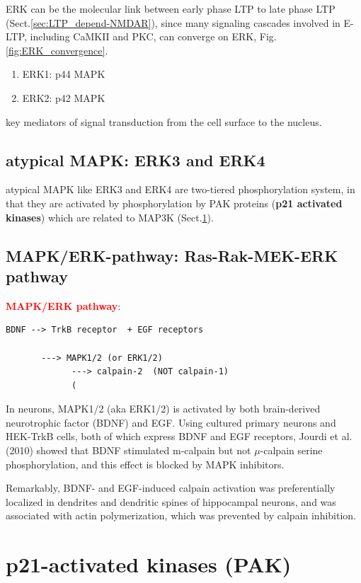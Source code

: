     
ERK can be the molecular link between early phase LTP to late phase LTP
(Sect.\ref{sec:LTP_depend-NMDAR}), since many signaling cascades involved in
E-LTP, including CaMKII and PKC, can converge on ERK,
Fig.\ref{fig:ERK_convergence}.
  
\begin{enumerate}
    \item ERK1: p44 MAPK
    \item ERK2: p42 MAPK
\end{enumerate}
key mediators of signal transduction from the cell surface to the nucleus. 

\subsection{atypical MAPK: ERK3 and ERK4}
\label{sec:ERK3}

atypical MAPK like ERK3 and ERK4 are two-tiered phosphorylation system, in that
they are activated by phosphorylation by PAK proteins ({\bf p21 activated
kinases}) which are related to MAP3K (Sect.\ref{sec:p21-activated-kinases}).



\subsection{MAPK/ERK-pathway: Ras-Rak-MEK-ERK pathway}
\label{sec:MAPK/ERK-pathway}

\textcolor{red}{\bf MAPK/ERK pathway}:
\begin{verbatim}
BDNF --> TrkB receptor  + EGF receptors

       ---> MAPK1/2 (or ERK1/2)
             ---> calpain-2  (NOT calpain-1)
             (
\end{verbatim}   

In neurons, MAPK1/2 (aka ERK1/2) is activated by both brain-derived neurotrophic
factor (BDNF) and EGF. Using cultured primary neurons and HEK-TrkB cells, both
of which express BDNF and EGF receptors, Jourdi et al. (2010) showed that BDNF
stimulated m-calpain but not $\mu$-calpain serine phosphorylation, and this
effect is blocked by MAPK inhibitors.

Remarkably, BDNF- and EGF-induced calpain activation was preferentially
localized in dendrites and dendritic spines of hippocampal neurons, and was
associated with actin polymerization, which was prevented by calpain inhibition.




\section{p21-activated kinases (PAK)}
\label{sec:p21-activated-kinases}

